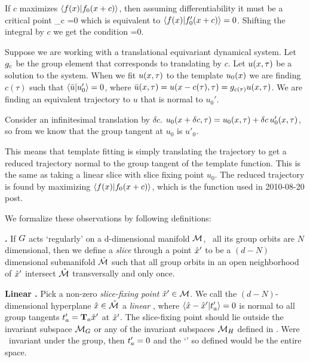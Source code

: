 \begin{description}
If $c$ maximizes $\braket{f(\ssp)}{f_0(\ssp+c)}$, then assuming
differentiability it must be a critical point \beq
\partial_c =0
\eeq which is equivalent to $\braket{f(\ssp)}{f_0'(\ssp+c)}=0$.
Shifting the integral by $c$ we get the condition \beq
{}=0. \eeq

Suppose we are working with a translational equivariant dynamical
system. Let $g_c$ be the group element that corresponds to
translating by $c$. Let $u(x,\tau)$ be a solution to the system.
When we fit $u(x,\tau)$ to the template $u_0(x)$ we are finding
$c(\tau)$ such that $\braket{\bar{u}}{u'_0}=0$, where
$\bar{u}(x,\tau)=u(x-c(\tau),\tau)=g_{c(\tau)}u(x,\tau)$.
We are finding an equivalent trajectory to $u$ that is normal to
$u_0'$.

Consider an infinitesimal translation by $\delta c$. $u_0(x+\delta
c,\tau)=u_0(x,\tau)+\delta c \, u'_0(x,\tau)$, so from
 we know that the group tangent at $u_0$ is
$u'_0$.

This means that template fitting is simply translating the trajectory
to get a reduced trajectory normal to the group tangent of the
template function. This is the same as taking a linear slice
 with slice fixing point $u_0$. The reduced
trajectory is found by maximizing $\braket{f(\ssp)}{f_0(\ssp+c)}$,
which is the function used in 2010-08-20 post.

 We formalize these observations by following definitions:

\begin{definition}
\textbf{\Slice.} If $G$ acts `regularly' on a d-dimensional
manifold ${\cal M}$, \ie\ all its group orbits are $N$ dimensional, then
we define a
\emph{slice} through a
point ${\hat{x}'}$ to be a $(d\!-\!N)$ dimensional submanifold $\hat{\cal M}$
such that all group orbits in an open neighborhood of ${\hat{x}'}$
intersect $\hat{\cal M}$ transversally and only once.
\end{definition}

\begin{definition}
\label{def:slice}
\textbf{Linear \slice.}
Pick a non-zero \emph{slice-fixing point} ${\hat{x}'} \in {\cal M}$.
We call the $(d\!-\!N)$-dimensional hyperplane $\hat{x} \in \hat{\cal M}$
a \emph{linear \slice}, where
\(
\braket{\sspRed - \slicep}{\sliceTan{a}}=0
\) %
is normal to all group tangents $ t'_{a}= \mathbf{T}_a {\hat{x}'}$ at ${\hat{x}'}$. The {slice-fixing point} should lie outside the invariant subspace ${\cal M}_{G}$ or any of the invariant subspaces ${\cal M}_H$ defined in . Were \slicep\ invariant under the group, then $t'_{a}=0$ and the `\slice' so defined would be the entire space.


\end{definition}
\end{description}
